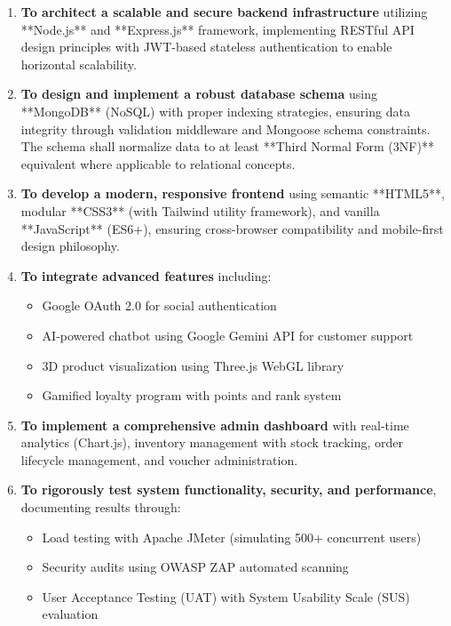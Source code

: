 \begin{enumerate}
    \item \textbf{To architect a scalable and secure backend infrastructure} utilizing **Node.js** and **Express.js** framework, implementing RESTful API design principles with JWT-based stateless authentication to enable horizontal scalability.
    
    \item \textbf{To design and implement a robust database schema} using **MongoDB** (NoSQL) with proper indexing strategies, ensuring data integrity through validation middleware and Mongoose schema constraints. The schema shall normalize data to at least **Third Normal Form (3NF)** equivalent where applicable to relational concepts.
    
    \item \textbf{To develop a modern, responsive frontend} using semantic **HTML5**, modular **CSS3** (with Tailwind utility framework), and vanilla **JavaScript** (ES6+), ensuring cross-browser compatibility and mobile-first design philosophy.
    
    \item \textbf{To integrate advanced features} including:
    \begin{itemize}
        \item Google OAuth 2.0 for social authentication
        \item AI-powered chatbot using Google Gemini API for customer support
        \item 3D product visualization using Three.js WebGL library
        \item Gamified loyalty program with points and rank system
    \end{itemize}
    
    \item \textbf{To implement a comprehensive admin dashboard} with real-time analytics (Chart.js), inventory management with stock tracking, order lifecycle management, and voucher administration.
    
    \item \textbf{To rigorously test system functionality, security, and performance}, documenting results through:
    \begin{itemize}
        \item Load testing with Apache JMeter (simulating 500+ concurrent users)
        \item Security audits using OWASP ZAP automated scanning
        \item User Acceptance Testing (UAT) with System Usability Scale (SUS) evaluation
    \end{itemize}
\end{enumerate}

